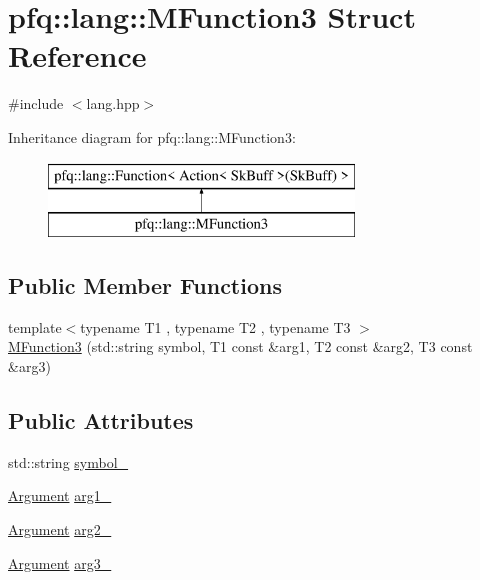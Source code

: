 \hypertarget{structpfq_1_1lang_1_1MFunction3}{\section{pfq\+:\+:lang\+:\+:M\+Function3 Struct Reference}
\label{structpfq_1_1lang_1_1MFunction3}
}


{\ttfamily \#include $<$lang.\+hpp$>$}

Inheritance diagram for pfq\+:\+:lang\+:\+:M\+Function3\+:\begin{figure}[H]
\begin{center}
\leavevmode
\includegraphics[height=2.000000cm]{structpfq_1_1lang_1_1MFunction3}
\end{center}
\end{figure}
\subsection*{Public Member Functions}
\begin{DoxyCompactItemize}
\item 
{\footnotesize template$<$typename T1 , typename T2 , typename T3 $>$ }\\\hyperlink{structpfq_1_1lang_1_1MFunction3_a5d8b4238c492324589867158417b1acb}{M\+Function3} (std\+::string symbol, T1 const \&arg1, T2 const \&arg2, T3 const \&arg3)
\end{DoxyCompactItemize}
\subsection*{Public Attributes}
\begin{DoxyCompactItemize}
\item 
std\+::string \hyperlink{structpfq_1_1lang_1_1MFunction3_a4e17f4bb1eba6f141896f2cc0e729451}{symbol\+\_\+}
\item 
\hyperlink{structpfq_1_1lang_1_1Argument}{Argument} \hyperlink{structpfq_1_1lang_1_1MFunction3_a992b900c67a4a0398e2c84916fbce35f}{arg1\+\_\+}
\item 
\hyperlink{structpfq_1_1lang_1_1Argument}{Argument} \hyperlink{structpfq_1_1lang_1_1MFunction3_a406f1ce0539a6707e79ea0893c8c6edd}{arg2\+\_\+}
\item 
\hyperlink{structpfq_1_1lang_1_1Argument}{Argument} \hyperlink{structpfq_1_1lang_1_1MFunction3_a8f9f1b512c22a9a4589cce7c41e98d6f}{arg3\+\_\+}
\end{DoxyCompactItemize}
